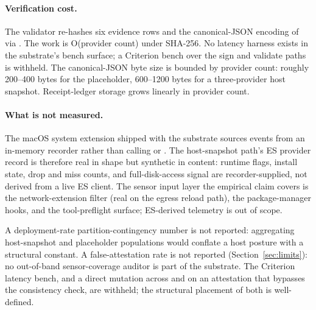 \paragraph{Verification cost.}
The validator re-hashes six evidence rows and the canonical-JSON encoding of  via . The work is O(provider count) under SHA-256. No latency harness exists in the substrate's bench surface; a Criterion bench over the sign and validate paths is withheld. The canonical-JSON byte size is bounded by provider count: roughly 200--400 bytes for the placeholder, 600--1200 bytes for a three-provider host snapshot. Receipt-ledger storage grows linearly in provider count.

\paragraph{What is not measured.}
The macOS  system extension shipped with the substrate sources events from an in-memory recorder rather than calling  or . The host-snapshot path's ES provider record is therefore real in shape but synthetic in content: runtime flags, install state, drop and miss counts, and full-disk-access signal are recorder-supplied, not derived from a live ES client. The sensor input layer the empirical claim covers is the network-extension filter (real on the egress reload path), the package-manager hooks, and the tool-preflight surface; ES-derived telemetry is out of scope.

A deployment-rate partition-contingency number is not reported: aggregating host-snapshot and placeholder populations would conflate a host posture with a structural constant. A false-attestation rate is not reported (Section~\ref{sec:limits}): no out-of-band sensor-coverage auditor is part of the substrate. The Criterion latency bench, and a direct mutation across  and  on an attestation that bypasses the consistency check, are withheld; the structural placement of both is well-defined.
